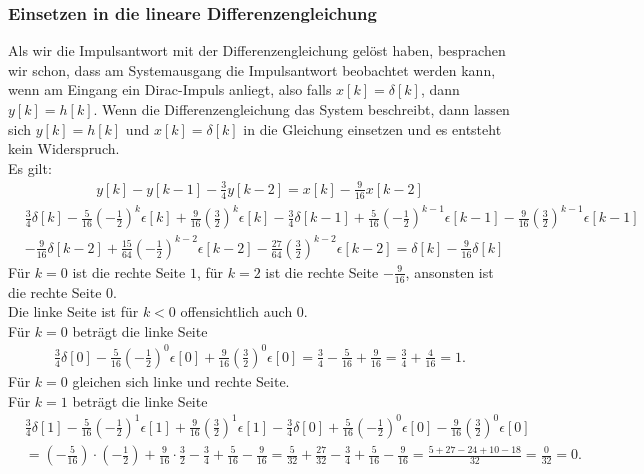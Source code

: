 \documentclass[11pt,a4paper,DIV=12]{scrartcl}
\begin{document}
\subsubsection*{Einsetzen in die lineare Differenzengleichung}
Als wir die Impulsantwort mit der Differenzengleichung gelöst haben, besprachen wir schon, dass am Systemausgang die Impulsantwort beobachtet werden kann, wenn am Eingang ein Dirac-Impuls anliegt, also falls $x[k]=\delta[k]$, dann $y[k]=h[k]$. Wenn die Differenzengleichung das System beschreibt, dann lassen sich $y[k]=h[k]$ und $x[k]=\delta[k]$ in die Gleichung einsetzen und es entsteht kein Widerspruch.\\
Es  gilt:
\begin{gather}
	y[k]-y[k-1]-\frac{3}{4}y[k-2]=x[k]-\frac{9}{16}x[k-2]
\end{gather}
\begin{align}
	&\frac{3}{4}\delta[k]-\frac{5}{16}\left(-\frac{1}{2}\right)^k\epsilon[k]+\frac{9}{16}\left(\frac{3}{2}\right)^k\epsilon[k]-\frac{3}{4}\delta[k-1]+\frac{5}{16}\left(-\frac{1}{2}\right)^{k-1}\epsilon[k-1]-\frac{9}{16}\left(\frac{3}{2}\right)^{k-1}\epsilon[k-1]\nonumber \\
	&-\frac{9}{16}\delta[k-2]+\frac{15}{64}\left(-\frac{1}{2}\right)^{k-2}\epsilon[k-2]-\frac{27}{64}\left(\frac{3}{2}\right)^{k-2}\epsilon[k-2]=\delta[k]-\frac{9}{16}\delta[k]
\end{align}
Für $k=0$ ist die rechte Seite $1$, für $k=2$ ist die rechte Seite $-\frac{9}{16}$, ansonsten ist die rechte Seite $0$.\\
Die linke Seite ist für $k<0$ offensichtlich auch 0.\\
Für $k=0$ beträgt die linke Seite
\begin{align}
	\frac{3}{4}\delta[0]-\frac{5}{16}\left(-\frac{1}{2}\right)^0\epsilon[0]+\frac{9}{16}\left(\frac{3}{2}\right)^0\epsilon[0]=\frac{3}{4}-\frac{5}{16}+\frac{9}{16}=\frac{3}{4}+\frac{4}{16}=1.
\end{align}
Für $k=0$ gleichen sich linke und rechte Seite.\\
Für $k=1$ beträgt die linke Seite
\begin{align}
	&\frac{3}{4}\delta[1]-\frac{5}{16}\left(-\frac{1}{2}\right)^1\epsilon[1]+\frac{9}{16}\left(\frac{3}{2}\right)^1\epsilon[1]-\frac{3}{4}\delta[0]+\frac{5}{16}\left(-\frac{1}{2}\right)^{0}\epsilon[0]-\frac{9}{16}\left(\frac{3}{2}\right)^{0}\epsilon[0]\nonumber\nonumber \\
	&=\left(-\frac{5}{16}\right)\cdot\left(-\frac{1}{2}\right)+\frac{9}{16}\cdot\frac{3}{2}-\frac{3}{4}+\frac{5}{16}-\frac{9}{16}=\frac{5}{32}+\frac{27}{32}-\frac{3}{4}+\frac{5}{16}-\frac{9}{16}=\frac{5+27-24+10-18}{32}=\frac{0}{32}=0.
\end{align}
\end{document}
